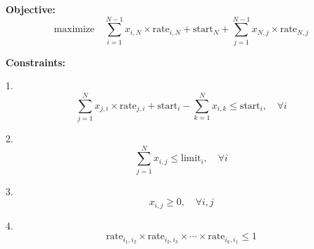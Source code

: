 \documentclass{article}
\begin{document}
\textbf{Objective:}
\[
\text{maximize} \quad \sum_{i=1}^{N-1} x_{i,N} \times \text{rate}_{i,N} + \text{start}_N + \sum_{j=1}^{N-1} x_{N,j} \times \text{rate}_{N,j}
\]

\textbf{Constraints:}

1. 
   \[
   \sum_{j=1}^{N} x_{j,i} \times \text{rate}_{j,i} + \text{start}_i - \sum_{k=1}^{N} x_{i,k} \leq \text{start}_i, \quad \forall i
   \]

2. 
   \[
   \sum_{j=1}^{N} x_{i,j} \leq \text{limit}_i, \quad \forall i
   \]

3. 
   \[
   x_{i,j} \geq 0, \quad \forall i, j
   \]

4. 
   \[
   \text{rate}_{i_1, i_2} \times \text{rate}_{i_2, i_3} \times \cdots \times \text{rate}_{i_k, i_1} \leq 1
   \]
\end{document}

